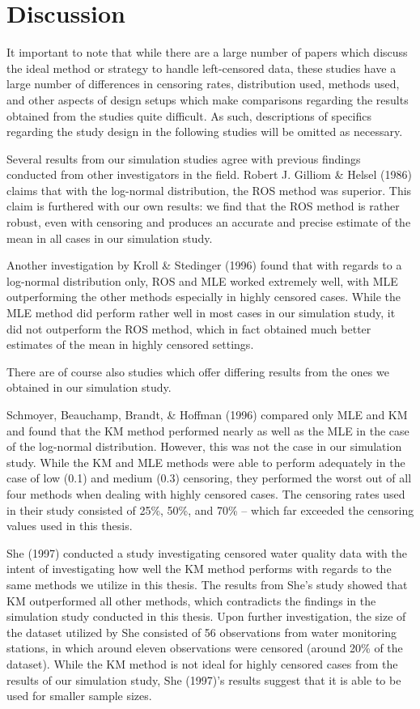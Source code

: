 \documentclass[12pt, twoside]{amherstthesis}
\begin{document}
\hypertarget{discussion}{%
\section{Discussion}\label{discussion}}

It important to note that while there are a large number of papers which discuss the ideal method or strategy to handle left-censored data, these studies have a large number of differences in censoring rates, distribution used, methods used, and other aspects of design setups which make comparisons regarding the results obtained from the studies quite difficult. As such, descriptions of specifics regarding the study design in the following studies will be omitted as necessary.

Several results from our simulation studies agree with previous findings conducted from other investigators in the field. Robert J. Gilliom \& Helsel (1986) claims that with the log-normal distribution, the ROS method was superior. This claim is furthered with our own results: we find that the ROS method is rather robust, even with censoring and produces an accurate and precise estimate of the mean in all cases in our simulation study.

Another investigation by Kroll \& Stedinger (1996) found that with regards to a log-normal distribution only, ROS and MLE worked extremely well, with MLE outperforming the other methods especially in highly censored cases. While the MLE method did perform rather well in most cases in our simulation study, it did not outperform the ROS method, which in fact obtained much better estimates of the mean in highly censored settings.

There are of course also studies which offer differing results from the ones we obtained in our simulation study.

Schmoyer, Beauchamp, Brandt, \& Hoffman (1996) compared only MLE and KM and found that the KM method performed nearly as well as the MLE in the case of the log-normal distribution. However, this was not the case in our simulation study. While the KM and MLE methods were able to perform adequately in the case of low (0.1) and medium (0.3) censoring, they performed the worst out of all four methods when dealing with highly censored cases. The censoring rates used in their study consisted of 25\%, 50\%, and 70\% -- which far exceeded the censoring values used in this thesis.

She (1997) conducted a study investigating censored water quality data with the intent of investigating how well the KM method performs with regards to the same methods we utilize in this thesis. The results from She's study showed that KM outperformed all other methods, which contradicts the findings in the simulation study conducted in this thesis. Upon further investigation, the size of the dataset utilized by She consisted of 56 observations from water monitoring stations, in which around eleven observations were censored (around 20\% of the dataset). While the KM method is not ideal for highly censored cases from the results of our simulation study, She (1997)'s results suggest that it is able to be used for smaller sample sizes.
\end{document}
